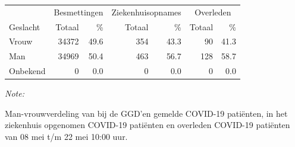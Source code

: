 \documentclass[
  english,
  man,floatsintext]{apa6}
\begin{document}
\begin{table}
\centering\begingroup\fontsize{11}{13}\selectfont

\begin{threeparttable}
\begin{tabular}{lrrrrrr}
\toprule
\multicolumn{1}{c}{ } & \multicolumn{2}{c}{Besmettingen} & \multicolumn{2}{c}{Ziekenhuisopnames} & \multicolumn{2}{c}{Overleden} \\
\cmidrule(l{3pt}r{3pt}){2-3} \cmidrule(l{3pt}r{3pt}){4-5} \cmidrule(l{3pt}r{3pt}){6-7}
Geslacht & Totaal & \% & Totaal & \% & Totaal & \%\\
\midrule
Vrouw & 34372 & 49.6 & 354 & 43.3 & 90 & 41.3\\
Man & 34969 & 50.4 & 463 & 56.7 & 128 & 58.7\\
Onbekend & 0 & 0.0 & 0 & 0.0 & 0 & 0.0\\
\bottomrule
\end{tabular}
\begin{tablenotes}
\item \textit{Note: } 
\item Man-vrouwverdeling van bij de GGD’en gemelde COVID-19 patiënten, in het ziekenhuis opgenomen COVID-19 patiënten en overleden COVID-19 patiënten van 08 mei t/m 22 mei 10:00 uur.
\end{tablenotes}
\end{threeparttable}
\endgroup{}
\end{table}
\newpage
\end{document}
